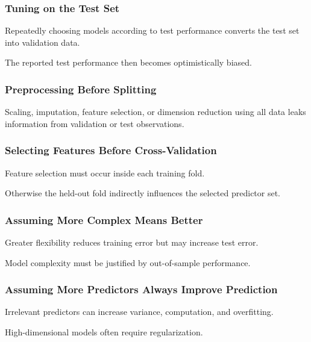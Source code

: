 \subsubsection{Tuning on the Test Set}

Repeatedly choosing models according to test performance converts the
test set into validation data.

The reported test performance then becomes optimistically biased.

\subsubsection{Preprocessing Before Splitting}

Scaling, imputation, feature selection, or dimension reduction using all
data leaks information from validation or test observations.

\subsubsection{Selecting Features Before Cross-Validation}

Feature selection must occur inside each training fold.

Otherwise the held-out fold indirectly influences the selected predictor
set.

\subsubsection{Assuming More Complex Means Better}

Greater flexibility reduces training error but may increase test error.

Model complexity must be justified by out-of-sample performance.

\subsubsection{Assuming More Predictors Always Improve Prediction}

Irrelevant predictors can increase variance, computation, and
overfitting.

High-dimensional models often require regularization.

